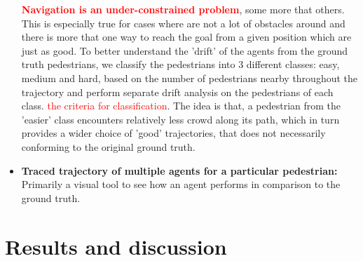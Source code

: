 \begin{itemize}
        \textbf{\textcolor{red}{Navigation is an under-constrained problem}}, some more that others. This is especially true for cases where are not a lot of obstacles around and there is more that one way to reach the goal from a given position which are just as good. To better understand the 'drift' of the agents from the ground truth pedestrians, we classify the pedestrians into 3 different classes: easy, medium and hard, based on the number of pedestrians nearby throughout the trajectory and perform separate drift analysis on the pedestrians of each class. \textcolor{red}{the criteria for classification}. The idea is that, a pedestrian from the 'easier' class encounters relatively less crowd along its path, which in turn provides a wider choice of 'good' trajectories, that does not necessarily conforming to the original ground truth. 
        \item \textbf{Traced trajectory of multiple agents for a particular pedestrian:} Primarily a visual tool to see how an agent performs in comparison to the ground truth.
\end{itemize}

\section*{Results and discussion}

